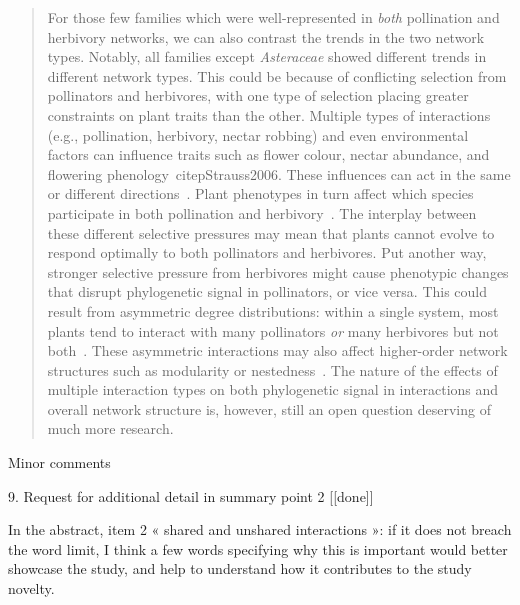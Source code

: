 \documentclass[12pt]{letter}
\newenvironment{refquote}{\bigskip \begin{it}}{\end{it}\smallskip}
\begin{document}
		\begin{quotation}

			For those few families which were well-represented in \emph{both} pollination
			and herbivory networks, we can also contrast the 
			trends in the two network types. Notably, all families except \emph{Asteraceae} 
			showed different trends in different network types. 
			This could be because of conflicting selection from pollinators and herbivores,
			with one type of selection placing greater constraints on plant traits than the other.
			Multiple types of interactions (e.g., pollination, herbivory, nectar robbing) 
			and even environmental factors can influence traits such as 
			flower colour, nectar abundance, and flowering phenology~citep{Strauss2006}. 
			These influences can act in the same or different directions~\citep{Strauss2006}.
			Plant phenotypes in turn affect which species participate in both pollination and herbivory~\citep{Strauss1997,Strauss2002,Adler2004,Adler2006,Theis2006}.
			The interplay between these different selective pressures may mean that plants
			cannot evolve to respond optimally to both pollinators and herbivores. Put another
			way, stronger selective pressure from herbivores might cause phenotypic changes
			that disrupt phylogenetic signal in pollinators, or vice versa. This could result from
			asymmetric degree distributions: within a single system, most plants tend to interact
			with many pollinators \emph{or} many herbivores but not both~\citep{Melian2009,Pockock2012,Astegiano2017}.
			These asymmetric interactions may also affect higher-order network structures such as
			modularity or nestedness~\citep{Astegiano2017}. The nature of the effects of multiple interaction types on both phylogenetic signal in interactions and overall network structure is, however, still an open question deserving of much more research.

		\end{quotation}


	Minor comments

	9. Request for additional detail in summary point 2 [[done]]

		\begin{refquote}
			In the abstract, item 2 « shared and unshared interactions »: if it does not breach the word limit, I think a few words specifying why this is important would better showcase the study, and help to understand how it contributes to the study novelty.
		\end{refquote}
\end{document}
